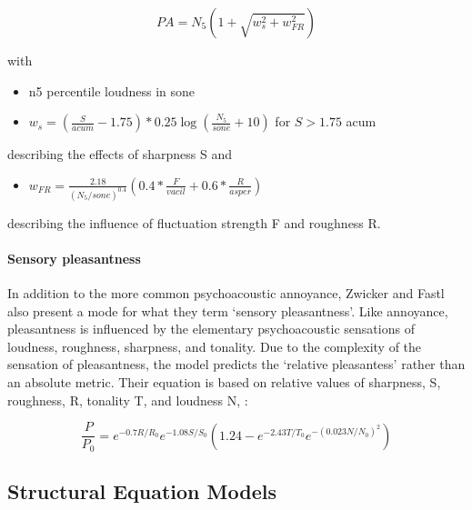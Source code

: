 \begin{equation}
  PA = N_5 ( 1 + \sqrt{w^2_s + w^2_{FR}})
\end{equation}

with 

\begin{itemize}
  \item \gls{n5} percentile loudness in sone
  \item $w_s = (\frac{S}{acum} - 1.75) * 0.25 \log{(\frac{N_5}{sone} + 10)}$ for $S > 1.75$ acum
\end{itemize}

describing the effects of sharpness S and 

\begin{itemize}
  \item $w_{FR} = \frac{2.18}{(N_5/sone)^{0.4}} (0.4 * \frac{F}{vacil} + 0.6 * \frac{R}{asper})$
\end{itemize}

describing the influence of fluctuation strength F and roughness R.


\paragraph*{Sensory pleasantness} In addition to the more common psychoacoustic annoyance, Zwicker and Fastl also present a mode for what they term `sensory pleasantness'. Like annoyance, pleasantness is influenced by the elementary psychoacoustic sensations of loudness, roughness, sharpness, and tonality. Due to the complexity of the sensation of pleasantness, the model predicts the `relative pleasantess' rather than an absolute metric. Their equation is based on relative values of sharpness, S, roughness, R, tonality T, and loudness N, \citep[p. 245]{PsychoacousticsfactsmodelsZwicker}:

\begin{equation}
  \frac{P}{P_0} = e^{-0.7 R/R_0} e^{-1.08 S/S_0} (1.24 - e^{-2.43 T/T_0} e^{-(0.023 N/N_0)^2})
\end{equation}

\subsection{Structural Equation Models}


